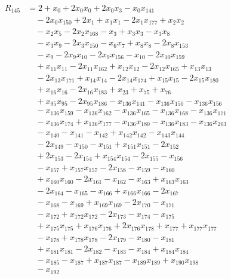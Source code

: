 \begin{align*}
R_{145}&={}2 +x_{0} +2x_{0}x_{0} +2x_{0}x_{3} -x_{0}x_{141}\\
&\quad{}-2x_{0}x_{150} +2x_{1} +x_{1}x_{1} -2x_{1}x_{177} +x_{2}x_{2}\\
&\quad{}-x_{2}x_{5} -2x_{2}x_{168} -x_{3} +x_{3}x_{3} -x_{3}x_{8}\\
&\quad{}-x_{3}x_{9} -2x_{3}x_{150} -x_{6}x_{7} +x_{8}x_{8} -2x_{8}x_{153}\\
&\quad{}-x_{9} -2x_{9}x_{10} -2x_{9}x_{156} -x_{10} -2x_{10}x_{159}\\
&\quad{}+x_{11}x_{11} -2x_{11}x_{162} +x_{12}x_{12} -2x_{12}x_{165} +x_{13}x_{13}\\
&\quad{}-2x_{13}x_{171} +x_{14}x_{14} -2x_{14}x_{174} +x_{15}x_{15} -2x_{15}x_{180}\\
&\quad{}+x_{16}x_{16} -2x_{16}x_{183} +x_{23} +x_{75} +x_{76}\\
&\quad{}+x_{95}x_{95} -2x_{95}x_{186} -x_{136}x_{141} -x_{136}x_{150} -x_{136}x_{156}\\
&\quad{}-x_{136}x_{159} -x_{136}x_{162} -x_{136}x_{165} -x_{136}x_{168} -x_{136}x_{171}\\
&\quad{}-x_{136}x_{174} +x_{136}x_{177} -x_{136}x_{180} -x_{136}x_{183} -x_{136}x_{203}\\
&\quad{}-x_{140} -x_{141} -x_{142} +x_{142}x_{142} -x_{143}x_{144}\\
&\quad{}-2x_{149} -x_{150} -x_{151} +x_{151}x_{151} -2x_{152}\\
&\quad{}+2x_{153} -2x_{154} +x_{154}x_{154} -2x_{155} -x_{156}\\
&\quad{}-x_{157} +x_{157}x_{157} -2x_{158} -x_{159} -x_{160}\\
&\quad{}+x_{160}x_{160} -2x_{161} -x_{162} -x_{163} +x_{163}x_{163}\\
&\quad{}-2x_{164} -x_{165} -x_{166} +x_{166}x_{166} -2x_{167}\\
&\quad{}-x_{168} -x_{169} +x_{169}x_{169} -2x_{170} -x_{171}\\
&\quad{}-x_{172} +x_{172}x_{172} -2x_{173} -x_{174} -x_{175}\\
&\quad{}+x_{175}x_{175} +x_{176}x_{176} +2x_{176}x_{178} +x_{177} +x_{177}x_{177}\\
&\quad{}-x_{178} +x_{178}x_{178} -2x_{179} -x_{180} -x_{181}\\
&\quad{}+x_{181}x_{181} -2x_{182} -x_{183} -x_{184} +x_{184}x_{184}\\
&\quad{}-x_{185} -x_{187} +x_{187}x_{187} -x_{189}x_{189} +x_{190}x_{198}\\
&\quad{}-x_{192}
\end{align*}

